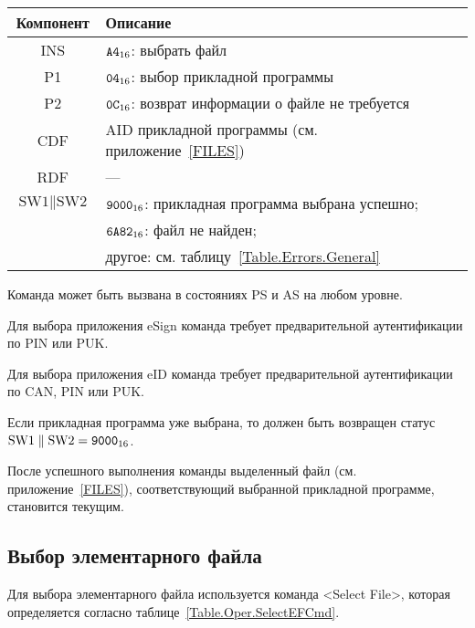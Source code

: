 \begin{table}[hbt]
\caption{}\label{Table.Oper.SelectAppCmd}
\begin{tabular}{|c|p{14cm}|}
\hline
Компонент & Описание \\
\hline
\hline
INS & $\texttt{A4}_{16}$: выбрать файл\\ 
\hline
P1 & $\texttt{04}_{16}$: выбор прикладной программы\\
\hline
P2 & $\texttt{0C}_{16}$: возврат информации о файле не требуется \\
\hline
CDF & AID прикладной программы (см. приложение~\ref{FILES})\\
\hline 
RDF &  --- \\
\hline
$\text{SW1}\parallel\text{SW2}$ & 
$\texttt{9000}_{16}$: прикладная программа выбрана успешно; \\
  & $\texttt{6A82}_{16}$: файл не найден; \\
  & другое: см. таблицу~\ref{Table.Errors.General}\\
\hline
\end{tabular}
\end{table}

Команда может быть вызвана в состояниях PS и AS
на любом уровне.

Для выбора приложения eSign команда требует 
предварительной аутентификации по PIN или PUK.

Для выбора приложения eID команда требует 
предварительной аутентификации по CAN, PIN или PUK.

Если прикладная программа уже выбрана, то должен быть возвращен
статус $\text{SW1} \parallel \text{SW2} = \texttt{9000}_{16}$.

После успешного выполнения команды выделенный файл 
(см. приложение~\ref{FILES}), 
соответствующий выбранной прикладной программе, становится текущим.


\subsection{Выбор элементарного файла}
\label{Oper.Descr.SelectEF}

Для выбора элементарного файла используется 
команда <Select File>, 
которая определяется согласно 
таблице~\ref{Table.Oper.SelectEFCmd}.

